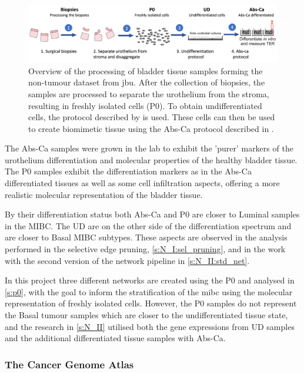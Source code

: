 \begin{figure}[!htb]
    \centering
    \includegraphics[width=1.0\textwidth, keepaspectratio]{Sections/Lit_review/Resources/differentiation.png}
    \caption{Overview of the processing of bladder tissue samples forming the non-tumour dataset from \acrfull{jbu}. After the collection of biopsies, the samples are processed to separate the urothelium from the stroma, resulting in freshly isolated cells (P0). To obtain undifferentiated cells, the protocol described by \citet{Cross2005-fe} is used. These cells can then be used to create biomimetic tissue using the Abs-Ca protocol described in \citet{Cross2005-fe}.}
    \label{fig:lit:diff_samples}
\end{figure}

The Abs-Ca samples were grown in the lab to exhibit the 'purer' markers of the urothelium differentiation and molecular properties of the healthy bladder tissue. The P0 samples exhibit the differentiation markers as in the Abs-Ca differentiated tissues as well as some cell infiltration aspects, offering a more realistic molecular representation of the bladder tissue. 

By their differentiation status both Abs-Ca and P0 are closer to Luminal samples in the MIBC. The UD are on the other side of the differentiation spectrum and are closer to Basal MIBC subtypes. These aspects are observed in the analysis performed in the selective edge pruning, \cref{s:N_I:sel_pruning}, and in the work with the second version of the network pipeline in \cref{s:N_II:std_net}.

In this project three different networks are created using the P0 and analysed in \cref{s:p0}, with the goal to inform the stratification of the \acrfull{mibc} using the molecular representation of freshly isolated cells. However, the P0 samples do not represent the Basal tumour samples which are closer to the  undifferentiated tissue state, and the research in \cref{s:N_II} utilised both the gene expressions from UD samples and the additional differentiated tissue samples with Abs-Ca.

\subsubsection*{The Cancer Genome Atlas} \label{s:lit:tcga_data}

